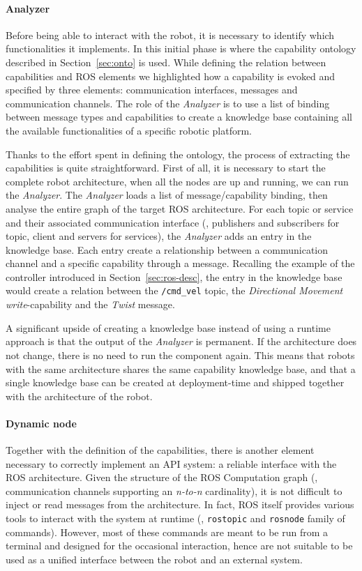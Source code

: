 \paragraph{Analyzer} Before being able to interact with the robot, it is necessary to identify which functionalities it implements. In this initial phase is where the capability ontology described in Section~\ref{sec:onto} is used. While defining the relation between capabilities and ROS elements we highlighted how a capability is evoked and specified by three elements: communication interfaces, messages and communication channels. The role of the \textit{Analyzer} is to use a list of binding between message types and capabilities to create a knowledge base containing all the available functionalities of a specific robotic platform.

Thanks to the effort spent in defining the ontology, the process of extracting the capabilities is quite straightforward. First of all, it is necessary to start the complete robot architecture, when all the nodes are up and running, we can run the \textit{Analyzer}. The \textit{Analyzer} loads a list of message/capability binding, then analyse the entire graph of the target ROS architecture. For each topic or service and their associated communication interface (\ie, publishers and subscribers for topic, client and servers for services), the \textit{Analyzer} adds an entry in the knowledge base. Each entry create a relationship between a communication channel and a specific capability through a message. Recalling the example of the controller introduced in Section~\ref{sec:ros-desc}, the entry in the knowledge base would create a relation between the \texttt{/cmd\_vel} topic, the \textit{Directional Movement} \textit{write}-capability and the \textit{Twist} message.

A significant upside of creating a knowledge base instead of using a runtime approach is that the output of the \textit{Analyzer} is permanent. If the architecture does not change, there is no need to run the component again. This means that robots with the same architecture shares the same capability knowledge base, and that a single knowledge base can be created at deployment-time and shipped together with the architecture of the robot.

\paragraph{Dynamic node} Together with the definition of the capabilities, there is another element necessary to correctly implement an API system: a reliable interface with the ROS architecture. Given the structure of the ROS Computation graph (\ie, communication channels supporting an \textit{n-to-n} cardinality), it is not difficult to inject or read messages from the architecture. In fact, ROS itself provides various tools to interact with the system at runtime (\eg, \texttt{rostopic} and \texttt{rosnode} family of commands). However, most of these commands are meant to be run from a terminal and designed for the occasional interaction, hence are not suitable to be used as a unified interface between the robot and an external system.


